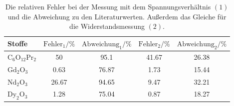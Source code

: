 \begin{table}\caption{Die relativen Fehler bei der Messung mit dem Spannungsverhältnis $(1)$ und die Abweichung zu den Literaturwerten. Außerdem das Gleiche für die Widerstandsmessung $(2)$.}
\label{taberr}
\centering
{}
\begin{tabular}{l S S S S} 
\toprule
{Stoffe} & {$\text{Fehler}_1 / \si{\percent}$} & {$\text{Abweichung}_1 / \si{\percent}$} & {$\text{Fehler}_2 / \si{\percent}$} & {$\text{Abweichung}_2 / \si{\percent}$} \\
\midrule
$\text{C}_6 \text{O}_{12} \text{Pr}_2$  & 50  & 95.1 & 41.67 & 26.38  \\
$\text{Gd}_2 \text{O}_3$                & 0.63 & 76.87 & 1.73 & 15.44 \\
$\text{Nd}_2 \text{O}_3$                & 26.67 & 94.65 & 9.47 & 32.21 \\
$\text{Dy}_2 \text{O}_3$                & 1.28 & 75.04 & 0.87 & 18.27 \\
\bottomrule
\end{tabular}\end{table}
